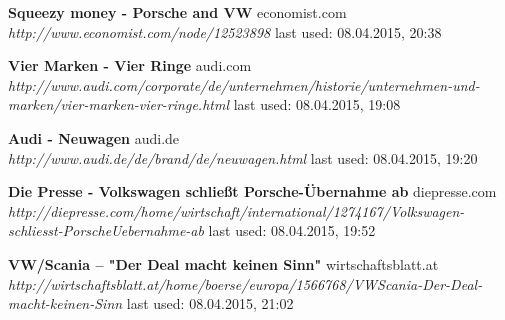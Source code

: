 \documentclass[12pt]{article}
\begin{document}
\begin{thebibliography}{56}
\textbf{Squeezy money - Porsche and VW} economist.com \\
\textit{http://www.economist.com/node/12523898}
\newline last used: 08.04.2015, 20:38

\textbf{Vier Marken - Vier Ringe} audi.com \\
\textit{http://www.audi.com/corporate/de/unternehmen/historie/unternehmen-und-marken/vier-marken-vier-ringe.html}
\newline last used: 08.04.2015, 19:08

\textbf{Audi - Neuwagen} audi.de \\
\textit{http://www.audi.de/de/brand/de/neuwagen.html}
\newline last used: 08.04.2015, 19:20

\textbf{Die Presse - Volkswagen schließt Porsche-Übernahme ab} diepresse.com \\
\textit{http://diepresse.com/home/wirtschaft/international/1274167/Volkswagen-schliesst-PorscheUebernahme-ab}
\newline last used: 08.04.2015, 19:52

\textbf{VW/Scania – "Der Deal macht keinen Sinn"} wirtschaftsblatt.at \\
\textit{http://wirtschaftsblatt.at/home/boerse/europa/1566768/VWScania-Der-Deal-macht-keinen-Sinn}
\newline last used: 08.04.2015, 21:02


\end{thebibliography}
\end{document}
